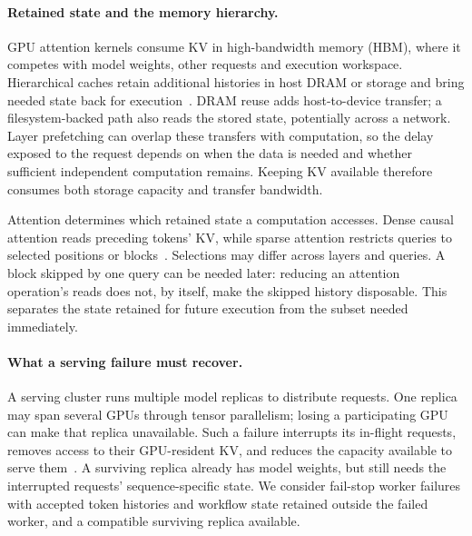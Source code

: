 \paragraph{Retained state and the memory hierarchy.}
GPU attention kernels consume KV in high-bandwidth memory (HBM), where
it competes with model weights, other requests and execution workspace.
Hierarchical caches retain additional histories in host DRAM or storage
and bring needed state back for execution~\cite{qin2025mooncake,gao2024cachedattention}.
DRAM reuse adds host-to-device transfer; a filesystem-backed path also
reads the stored state, potentially across a network. Layer prefetching
can overlap these transfers with computation, so the delay exposed to
the request depends on when the data is needed and whether sufficient
independent computation remains. Keeping KV available therefore consumes
both storage capacity and transfer bandwidth.

Attention determines which retained state a computation accesses. Dense
causal attention reads preceding tokens' KV, while sparse attention
restricts queries to selected positions or blocks~\cite{jiang2024minference}.
Selections may differ across layers and queries. A block skipped by one
query can be needed later: reducing an attention operation's reads does
not, by itself, make the skipped history disposable. This separates the
state retained for future execution from the subset needed immediately.

\paragraph{What a serving failure must recover.}
A serving cluster runs multiple model replicas to distribute requests.
One replica may span several GPUs through tensor parallelism; losing a
participating GPU can make that replica unavailable. Such a failure
interrupts its in-flight requests, removes access to their GPU-resident
KV, and reduces the capacity available to serve them~\cite{cao2026lumen}.
A surviving replica already has model weights, but still needs the
interrupted requests' sequence-specific state. We consider fail-stop
worker failures with accepted token histories and workflow state retained
outside the failed worker, and a compatible surviving replica available.

